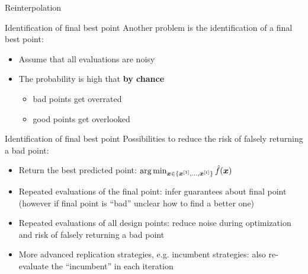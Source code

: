 \documentclass[11pt,compress,t,notes=noshow, xcolor=table]{beamer}
\begin{document}
\begin{framev}[fs=small]{Reinterpolation}
\begin{algorithm}[H]
\caption{Reinterpolation Procedure}
\begin{algorithmic}[1]
\end{algorithmic}
\end{algorithm}
\vfill
{}
\end{framev}

\begin{framev}{Identification of final best point}
Another problem is the identification of a final best point:
\begin{itemize}
\item Assume that all evaluations are noisy
\item The probability is high that \textbf{by chance}
\begin{itemize}
\item bad points get overrated
\item good points get overlooked
\end{itemize}
\end{itemize}
\vfill
{}
\end{framev}


\begin{framev}{Identification of final best point}
Possibilities to reduce the risk of falsely returning a bad point:
\begin{itemize}
\item Return the best predicted point: $\mathop{\mathrm{arg\,min}}_{\bm{x} \in \{\bm{x}^{[1]}, \ldots, \bm{x}^{[t]}\}} \hat{f}(\bm{x})$
\item Repeated evaluations of the final point: infer guarantees about final point (however if final point is \enquote{bad} unclear how to find a better one)
\item Repeated evaluations of all design points: reduce noise during optimization and risk of falsely returning a bad point
\item More advanced replication strategies, e.g. incumbent strategies: also re-evaluate the \enquote{incumbent} in each iteration
\end{itemize}
\end{framev}

\endlecture
\end{document}
